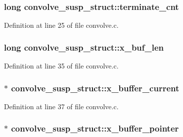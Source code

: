 \subsubsection[{\texorpdfstring{terminate\+\_\+cnt}{terminate_cnt}}]{\setlength{\rightskip}{0pt plus 5cm}long convolve\+\_\+susp\+\_\+struct\+::terminate\+\_\+cnt}\hypertarget{structconvolve__susp__struct_aae70c47632ff84e16d8cb6c2305efcf1}{}\label{structconvolve__susp__struct_aae70c47632ff84e16d8cb6c2305efcf1}


Definition at line 25 of file convolve.\+c.

\subsubsection[{\texorpdfstring{x\+\_\+buf\+\_\+len}{x_buf_len}}]{\setlength{\rightskip}{0pt plus 5cm}long convolve\+\_\+susp\+\_\+struct\+::x\+\_\+buf\+\_\+len}\hypertarget{structconvolve__susp__struct_abbdaff617b17f9cb5957248bb2394853}{}\label{structconvolve__susp__struct_abbdaff617b17f9cb5957248bb2394853}


Definition at line 35 of file convolve.\+c.

\subsubsection[{\texorpdfstring{x\+\_\+buffer\+\_\+current}{x_buffer_current}}]{$\ast$ convolve\+\_\+susp\+\_\+struct\+::x\+\_\+buffer\+\_\+current}\hypertarget{structconvolve__susp__struct_adf6ccb598225421de7376c422fd66f2a}{}\label{structconvolve__susp__struct_adf6ccb598225421de7376c422fd66f2a}


Definition at line 37 of file convolve.\+c.

\subsubsection[{\texorpdfstring{x\+\_\+buffer\+\_\+pointer}{x_buffer_pointer}}]{$\ast$ convolve\+\_\+susp\+\_\+struct\+::x\+\_\+buffer\+\_\+pointer}\hypertarget{structconvolve__susp__struct_a82ff1520d5da80c7c3cd89d802803f08}{}\label{structconvolve__susp__struct_a82ff1520d5da80c7c3cd89d802803f08}


